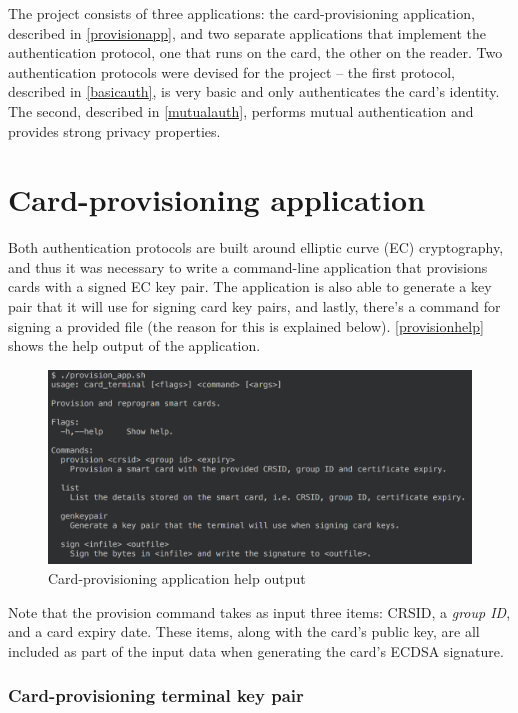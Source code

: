 \documentclass[12pt,a4paper,twoside,openright]{report}
\begin{document}
The project consists of three applications: the card-provisioning application, described in \autoref{provisionapp}, and two separate applications that implement the authentication protocol, one that runs on the card, the other on the reader. Two authentication protocols were devised for the project -- the first protocol, described in \autoref{basicauth}, is very basic and only authenticates the card's identity. The second, described in \autoref{mutualauth}, performs mutual authentication and provides strong privacy properties.

\section{Card-provisioning application}
\label{provisionapp}

Both authentication protocols are built around elliptic curve (EC) cryptography, and thus it was necessary to write a command-line application that provisions cards with a signed EC key pair. The application is also able to generate a key pair that it will use for signing card key pairs, and lastly, there's a command for signing a provided file (the reason for this is explained below). \autoref{provisionhelp} shows the help output of the application.

\begin{figure}[tbh]
\centerline{\includegraphics[scale=0.7]{figures/provisionhelp.png}}
\caption{Card-provisioning application help output}
\label{provisionhelp}
\end{figure}

Note that the provision command takes as input three items: CRSID, a \emph{group ID}, and a card expiry date. These items, along with the card's public key, are all included as part of the input data when generating the card's ECDSA signature.

\subsubsection{Card-provisioning terminal key pair}
\end{document}

